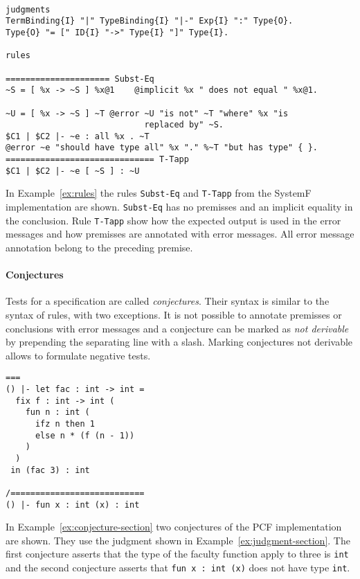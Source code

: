 \begin{example}{~}
\begin{verbatim}
judgments
TermBinding{I} "|" TypeBinding{I} "|-" Exp{I} ":" Type{O}.
Type{O} "= [" ID{I} "->" Type{I} "]" Type{I}.

rules

===================== Subst-Eq
~S = [ %x -> ~S ] %x@1    @implicit %x " does not equal " %x@1.

~U = [ %x -> ~S ] ~T @error ~U "is not" ~T "where" %x "is
                            replaced by" ~S.
$C1 | $C2 |- ~e : all %x . ~T 
@error ~e "should have type all" %x "." %~T "but has type" { }.
============================== T-Tapp
$C1 | $C2 |- ~e [ ~S ] : ~U
\end{verbatim}
\label{ex:rules}
\end{example}

In Example~\ref{ex:rules} the rules \verb|Subst-Eq| and \verb|T-Tapp|
from the SystemF  implementation are
shown. \verb|Subst-Eq| has no premisses and an implicit equality in
the conclusion. Rule \verb|T-Tapp| show how the expected output is
used in the error messages and how premisses are annotated with error
messages. All error message annotation belong to the preceding
premise.

\paragraph{Conjectures} Tests for a specification are called
\textit{conjectures}. Their syntax is similar to the syntax of rules,
with two exceptions. It is not possible to annotate premisses or
conclusions with error messages and a conjecture can be marked as
\textit{not derivable} by prepending the separating line with a
slash. Marking conjectures not derivable allows to formulate negative
tests.

\begin{example}
\begin{verbatim}
===
() |- let fac : int -> int = 
  fix f : int -> int (
    fun n : int (
      ifz n then 1 
      else n * (f (n - 1))
    )
  )
 in (fac 3) : int

/===========================
() |- fun x : int (x) : int
\end{verbatim}
\label{ex:conjecture-section}
\end{example}

In Example~\ref{ex:conjecture-section} two conjectures of the PCF
implementation are shown. They use the judgment shown in
Example~\ref{ex:judgment-section}. The first conjecture asserts that
the type of the faculty function apply to three is \verb|int| and the
second conjecture asserts that \verb|fun x : int (x)| does not have
type \verb|int|.

